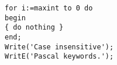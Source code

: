\documentclass{report}
\begin{document}
\begin{onlyproblem}[fragile]
\lstset{language=Pascal}
\begin{lstlisting}
for i:=maxint to 0 do
begin
{ do nothing }
end;
Write('Case insensitive');
WritE('Pascal keywords.');
\end{lstlisting}
\end{onlyproblem}
\end{document}
